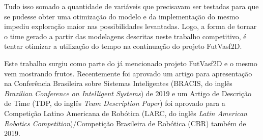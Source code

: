 Tudo isso somado a quantidade de variáveis que precisavam ser testadas para que
se pudesse obter uma otimização do modelo e da implementação do mesmo impediu
exploração maior nas possibilidades levantadas. Logo, a forma de tornar o time
gerado a partir das modelagens descritas neste trabalho competitivo, é tentar
otimizar a utilização do tempo na continuação do projeto FutVasf2D.

Este trabalho surgiu como parte do já mencionado projeto FutVasf2D e o mesmo vem
mostrando frutos. Recentemente foi aprovado um artigo para apresentação na
Conferência Brasileira sobre Sistemas Inteligentes (BRACIS, do inglês
\textit{Brazilian Conference on Intelligent Systems}) de 2019 e um Artigo de Descrição
de Time (TDP, do inglês \textit{Team Description Paper}) foi aprovado para a
Competição Latino Americana de Robótica (LARC, do inglês
\textit{Latin American Robotics Competition})/Competição Brasileira de Robótica (CBR)
também de 2019.